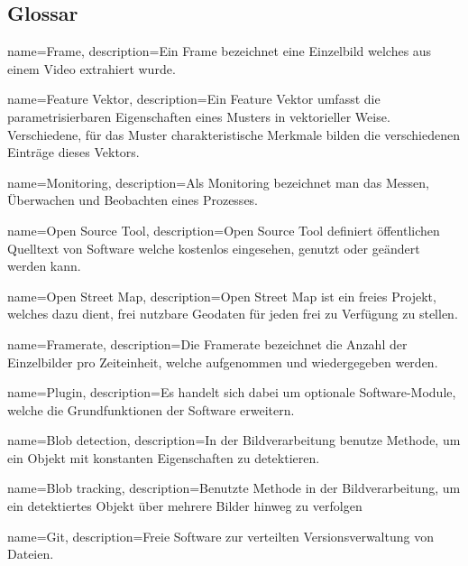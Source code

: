 \subsection{Glossar}

{
  name=Frame,
  description={Ein Frame bezeichnet eine Einzelbild welches aus einem Video extrahiert wurde. \cite{frame}}
}

{
  name=Feature Vektor,
  description={Ein Feature Vektor umfasst die parametrisierbaren Eigenschaften eines Musters in vektorieller Weise. Verschiedene, für das Muster charakteristische Merkmale bilden die verschiedenen Einträge dieses Vektors. \cite{featureVector}}
}

{
  name=Monitoring,
  description={Als Monitoring bezeichnet man das Messen, Überwachen und Beobachten eines Prozesses. \cite{monitoring}}
}

{
  name=Open Source Tool,
  description={Open Source Tool definiert öffentlichen Quelltext von Software welche kostenlos eingesehen, genutzt oder geändert werden kann. \cite{ost}}
}

{
  name=Open Street Map,
  description={Open Street Map ist ein freies Projekt, welches dazu dient, frei nutzbare Geodaten für jeden frei zu Verfügung zu stellen. \cite{osm}}
}

{
  name=Framerate,
  description={Die Framerate bezeichnet die Anzahl der Einzelbilder pro Zeiteinheit, welche aufgenommen und wiedergegeben werden. \cite{framerate}}
}

{
  name=Plugin,
  description={Es handelt sich dabei um optionale Software-Module, welche die Grundfunktionen der Software erweitern. \cite{plugin}}
}

{
  name=Blob detection,
  description={In der Bildverarbeitung benutze Methode, um ein Objekt mit konstanten Eigenschaften zu detektieren. \cite{blobDet}}
}

{
  name=Blob tracking,
  description={Benutzte Methode in der Bildverarbeitung, um ein detektiertes Objekt über mehrere Bilder hinweg zu verfolgen}
}


{
  name=Git,
  description={Freie Software zur verteilten Versionsverwaltung von Dateien. \cite{git}}
}

